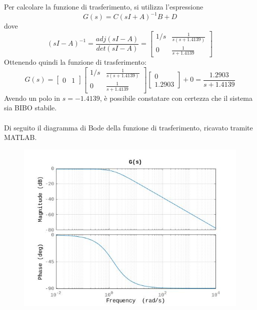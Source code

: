 \documentclass[a4paper,12pt,italian]{article}
\begin{document}
Per calcolare la funzione di trasferimento, si utilizza l'espressione
\begin{equation*}
    G(s) = C(sI + A)^{-1}B + D
\end{equation*}
dove
\begin{equation*}
    (sI - A)^{-1} = \frac{adj(sI - A)}{det(sI - A)} = 
    \begin{bmatrix}
        1/s & \frac{1}{s(s + 1.4139)} \\ 
        0   & \frac{1}{s + 1.4139}
    \end{bmatrix}
\end{equation*}
Ottenendo quindi la funzione di trasferimento:
\begin{equation*}
    G(s) =
    \begin{bmatrix}0 & 1 \end{bmatrix}
    \begin{bmatrix}
        1/s & \frac{1}{s(s+1.4139)} \\
        0 &\frac{1}{s+1.4139} \end{bmatrix}
    \begin{bmatrix}0 \\ 1.2903 \end{bmatrix}
    + 0 =
    \frac{1.2903}{s + 1.4139}
\end{equation*}
Avendo un polo in $s = -1.4139$, è possibile constatare con certezza che il sistema sia BIBO stabile.\\ \\
Di seguito il diagramma di Bode della funzione di trasferimento, ricavato tramite MATLAB.

\begin{figure}[h!]
    \begin{center}
        \includegraphics[scale=0.55]{img/bode_GG.jpg}
    \end{center}    
\end{figure}
\end{document}
